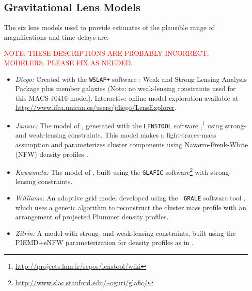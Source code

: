 \subsection{Gravitational Lens Models}\label{sec:LensingModels}



The six lens models used to provide estimates of the plausible range
of magnifications and time delays are:

 \textcolor{red}{NOTE: THESE
  DESCRIPTIONS ARE PROBABLY INCORRECT.  MODELERS, PLEASE FIX AS
  NEEDED.}


\bigskip
\begin{itemize}
\item{\it Diego:} Created with the {\tt WSLAP+} software
  \citep{Sendra:2014}: Weak and Strong Lensing Analysis Package plus
  member galaxies (Note: no weak-lensing constraints used for this
  MACS J0416 model). Interactive online model exploration available at
  \url{http://www.ifca.unican.es/users/jdiego/LensExplorer}.
\item{{\it Jauzac:} The model of \citet{Jauzac:2014}, generated with
  the {\tt LENSTOOL} software
  \citep{Jullo:2007},\footnote{\url{http://projects.lam.fr/repos/lenstool/wiki}}}
  using strong- and weak-lensing constraints.  This model makes a
  light-traces-mass assumption and parameterizes cluster components
  using Navarro-Frenk-White (NFW) density profiles
  \citep{Navarro:1997}.
\item{\it Kawamata:} The model of \citet{Kawamata:2015}, built using the
  {\tt GLAFIC}
  software\footnote{\url{http://www.slac.stanford.edu/~oguri/glafic/}}
  with strong-lensing constraints.
\item{{\it Williams:} An adaptive grid model developed using the {\tt
    GRALE} software tool
  \citep{Liesenborgs:2006,Liesenborgs:2007,Mohammed:2014}, which uses
  a genetic algorithm to reconstruct the cluster mass profile with an
  arrangement of projected Plummer \citeyear{Plummer:1911} density
  profiles.}
\item{{\it Zitrin:} A model with strong- and weak-lensing constraints,
  built using the PIEMD+eNFW parameterization for density profiles as
  in \citet{Zitrin:2009a}.}
\end{itemize}
\bigskip    

